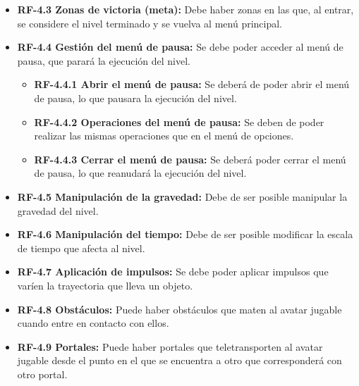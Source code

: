 \begin{itemize}
\begin{itemize}
\item
\textbf{RF-4.3 Zonas de victoria (meta):} Debe haber zonas en las que, al entrar, se considere el nivel terminado y se vuelva al menú principal.
\end{itemize}

\begin{itemize}
\item
\textbf{RF-4.4 Gestión del menú de pausa:} Se debe poder acceder al menú de pausa, que parará la ejecución del nivel.

\begin{itemize}
\item
\textbf{RF-4.4.1 Abrir el menú de pausa:} Se deberá de poder abrir el menú de pausa, lo que pausara la ejecución del nivel.
\end{itemize}

\begin{itemize}
\item
\textbf{RF-4.4.2 Operaciones del menú de pausa:} Se deben de poder realizar las mismas operaciones que en el menú de opciones.
\end{itemize}

\begin{itemize}
\item
\textbf{RF-4.4.3 Cerrar el menú de pausa:} Se deberá poder cerrar el menú de pausa, lo que reanudará la ejecución del nivel.
\end{itemize}
\end{itemize}

\begin{itemize}
\item
\textbf{RF-4.5 Manipulación de la gravedad:} Debe de ser posible manipular la gravedad del nivel.
\end{itemize}

\begin{itemize}
\item
\textbf{RF-4.6 Manipulación del tiempo:} Debe de ser posible modificar la escala de tiempo que afecta al nivel.
\end{itemize}

\begin{itemize}
\item
\textbf{RF-4.7 Aplicación de impulsos:} Se debe poder aplicar impulsos que varíen la trayectoria que lleva un objeto.
\end{itemize}

\begin{itemize}
\item
\textbf{RF-4.8 Obstáculos:} Puede haber obstáculos que maten al avatar jugable cuando entre en contacto con ellos.
\end{itemize}

\begin{itemize}
\item
\textbf{RF-4.9 Portales:} Puede haber portales que teletransporten al avatar jugable desde el punto en el que se encuentra a otro que corresponderá con otro portal.
\end{itemize}
\end{itemize}

